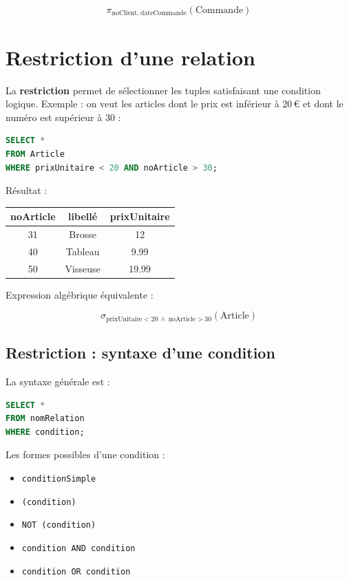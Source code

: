\[
\pi_{\text{noClient},\ \text{dateCommande}}(\text{Commande})
\]


\section{Restriction d’une relation}

La \textbf{restriction} permet de sélectionner les tuples satisfaisant une condition logique.  
Exemple : on veut les articles dont le prix est inférieur à 20\,€ et dont le numéro est supérieur à 30 :

\begin{sqlcodebox}
\begin{lstlisting}[language=SQL]
SELECT *
FROM Article
WHERE prixUnitaire < 20 AND noArticle > 30;
\end{lstlisting}
\end{sqlcodebox}

Résultat :


\begin{tabular}{|c|c|c|}
    \hline
    \textbf{noArticle} & \textbf{libellé} & \textbf{prixUnitaire} \\
    \hline
31 & Brosse & 12 \\
40 & Tableau & 9.99 \\
50 & Visseuse & 19.99 \\
    \hline
\end{tabular}

Expression algébrique équivalente :

\[
\sigma_{\text{prixUnitaire} < 20\ \wedge\ \text{noArticle} > 30}(\text{Article})
\]

\subsection{Restriction : syntaxe d'une condition}

La syntaxe générale est :

\begin{sqlcodebox}
\begin{lstlisting}[language=SQL]
SELECT *
FROM nomRelation
WHERE condition;
\end{lstlisting}
\end{sqlcodebox}

Les formes possibles d’une condition :

\begin{itemize}
    \item \texttt{conditionSimple}
    \item \texttt{(condition)}
    \item \texttt{NOT (condition)}
    \item \texttt{condition AND condition}
    \item \texttt{condition OR condition}
\end{itemize}

